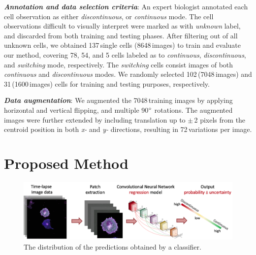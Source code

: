 \documentclass{article}
\begin{document}
\textit{\textbf{Annotation and data selection criteria}}:
An expert biologist annotated each cell observation as either \textit{discontinuous}, or  
\textit{continuous} mode. 
The cell observations difficult to visually interpret were marked as with \textit{unknown} 
label, and discarded from both training and testing phases. 
After filtering out of all unknown cells, we obtained 137\,single cells 
(8648\,images) to train and evaluate our method, covering 78, 54, and 5 cells labeled as to
\textit{continuous}, \textit{discontinuous}, and \textit{switching} mode, respectively. 
The \textit{switching} cells consist images of both \textit{continuous} and \textit{discontinuous} modes.
We randomly selected 102\,(7048\,images) and 31\,(1600\,images) cells for training and testing purposes, respectively.


\textit{\textbf{Data augmentation}}:
We augmented the 7048\,training images by applying horizontal and vertical flipping, 
and multiple 90$\degree$ rotations. The augmented images were further extended by including 
translation up to $\pm$\,2 pixels from the centroid position in both \textit{x-} and 
\textit{y-} directions, resulting in 72\,variations per image. 

\section{Proposed Method}
\label{sec:method}

\begin{figure}[b]
    \begin{minipage}[b]{1.0\linewidth}
        \centering
        \centerline{\includegraphics[width=1\linewidth]{paperImages/r4.png}}
    \end{minipage}
    \caption[fig1]{The distribution of the predictions obtained by a classifier.} 
\end{figure}
\end{document}
